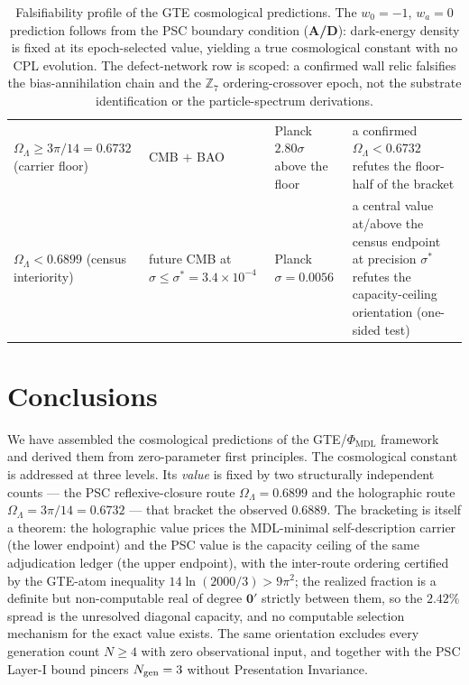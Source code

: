 \documentclass[11pt]{article}
\theoremstyle{remark}
\newcommand{\PHIMDL}{\Phi_{\mathrm{MDL}}}
\newcommand{\ZS}{\mathbb{Z}_7}
\newcommand{\OmL}{\Omega_\Lambda}
\newcommand{\CatAD}{\textbf{A/D}}
\begin{document}
\begin{table}[h]
\begin{tabularx}{\textwidth}{@{}P{2.8cm}P{3.0cm}P{3.2cm}Y@{}}
$\OmL \ge 3\pi/14 = 0.6732$ (carrier floor) & CMB $+$ BAO & Planck $2.80\sigma$ above the floor & a confirmed $\OmL < 0.6732$ refutes the floor-half of the bracket \\
$\OmL < 0.6899$ (census interiority) & future CMB at $\sigma \le \sigma^* = 3.4\times10^{-4}$ & Planck $\sigma = 0.0056$ & a central value at/above the census endpoint at precision $\sigma^*$ refutes the capacity-ceiling orientation (one-sided test) \\
\bottomrule
\end{tabularx}
\caption{Falsifiability profile of the GTE cosmological predictions. The $w_0=-1$, $w_a=0$ prediction follows from the PSC boundary condition (\CatAD): dark-energy density is fixed at its epoch-selected value, yielding a true cosmological constant with no CPL evolution. The defect-network row is scoped: a confirmed wall relic falsifies the bias-annihilation chain and the $\ZS$ ordering-crossover epoch, not the substrate identification or the particle-spectrum derivations.}
\label{tab:falsify}
\end{table}

\section{Conclusions}
\label{sec:conclusions}

We have assembled the cosmological predictions of the GTE/$\PHIMDL$ framework and
derived them from zero-parameter first principles. The cosmological constant is
addressed at three levels. Its \emph{value} is fixed by two structurally
independent counts --- the PSC reflexive-closure route $\OmL = 0.6899$ and the
holographic route $\OmL = 3\pi/14 = 0.6732$ --- that bracket the observed $0.6889$.
The bracketing is itself a theorem: the holographic value prices the
MDL-minimal self-description carrier (the lower endpoint) and the PSC value is
the capacity ceiling of the same adjudication ledger (the upper endpoint), with
the inter-route ordering certified by the GTE-atom inequality
$14\ln(2000/3) > 9\pi^2$; the realized fraction is a definite but
non-computable real of degree $\mathbf{0}'$ strictly between them, so the
$2.42\%$ spread is the unresolved diagonal capacity, and no computable
selection mechanism for the exact value exists. The same orientation excludes
every generation count $N \ge 4$ with zero observational input, and together
with the PSC Layer-I bound pincers $N_{\rm gen} = 3$ without Presentation
Invariance.
\end{document}
